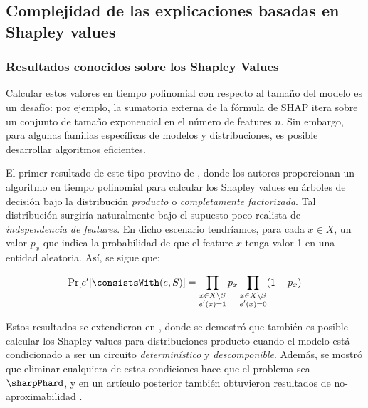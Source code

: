 \subsection{Complejidad de las explicaciones basadas en Shapley values}

\subsubsection{Resultados conocidos sobre los Shapley Values}

Calcular estos valores en tiempo polinomial con respecto al tamaño del modelo es un desafío: por ejemplo, la sumatoria externa de la fórmula de SHAP itera sobre un conjunto de tamaño exponencial en el número de features \(n\). Sin embargo, para algunas familias específicas de modelos y distribuciones, es posible desarrollar algoritmos eficientes.


El primer resultado de este tipo provino de \cite{lundberg2020local}, donde los autores proporcionan un algoritmo en tiempo polinomial para calcular los Shapley values en árboles de decisión bajo la distribución \textit{producto} o \textit{completamente factorizada}. Tal distribución surgiría naturalmente bajo el supuesto poco realista de \textit{independencia de features}. En dicho escenario tendríamos, para cada \(x \in X\), un valor \(p_x\) que indica la probabilidad de que el feature \(x\) tenga valor 1 en una entidad aleatoria. Así, se sigue que:

\[
\Pr[e' | \consistsWith(e, S)] = \prod_{\substack{x \in X \setminus S \\ e'(x) = 1}} p_x \prod_{\substack{x \in X \setminus S \\ e'(x) = 0}} (1-p_x) 
\]

Estos resultados se extendieron en \cite{arenas2021tractability}, donde se demostró que también es posible calcular los Shapley values para distribuciones producto cuando el modelo está condicionado a ser un circuito \textit{determinístico} y \textit{descomponible}. Además, se mostró que eliminar cualquiera de estas condiciones hace que el problema sea \(\sharpPhard\), y en un artículo posterior también obtuvieron resultados de no-aproximabilidad \cite{arenas2023complexity}.

